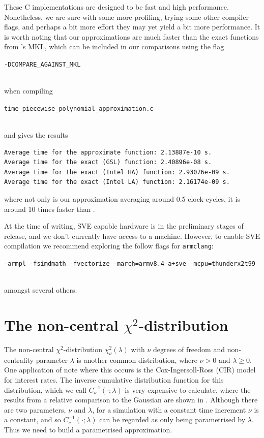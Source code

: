 \documentclass[11pt,a4paper,twoside,english]{extarticle}
\newcommand{\singlecodeline}[1]{\\[1em]\centerline{\lstinline[basicstyle=\ttfamily]$#1$}\\[1em]}
\begin{document}
These C implementations are designed to be fast and high performance. Nonetheless, we are sure with some more profiling, trying some other compiler flags, and perhaps a bit more effort they may yet yield a bit more performance. It is worth noting that our approximations are much faster than the exact functions from \intel's MKL, which can be included in our comparisons using the flag \singlecodeline{-DCOMPARE_AGAINST_MKL} when compiling \singlecodeline{time_piecewise_polynomial_approximation.c}
and gives the results
\begin{verbatim}
Average time for the approximate function: 2.13887e-10 s.
Average time for the exact (GSL) function: 2.40896e-08 s.
Average time for the exact (Intel HA) function: 2.93076e-09 s.
Average time for the exact (Intel LA) function: 2.16174e-09 s.
\end{verbatim}
where not only is our approximation averaging around 0.5 clock-cycles, it is around 10 times faster than \intel. 

At the time of writing, SVE capable hardware is in the preliminary stages of release, and we don't currently have access to a machine. However, to enable SVE compilation we recommend exploring the follow flags for \verb|armclang|: \singlecodeline{-armpl -fsimdmath -fvectorize -march=armv8.4-a+sve -mcpu=thunderx2t99}
amongst several others. 

\clearpage
\section{The non-central $ \chi^2 $-distribution}

The non-central $ \chi^2 $-distribution $ \chi^2_\nu(\lambda) $ with $ \nu $ degrees of freedom and non-centrality parameter $ \lambda $ is another common distribution, where $ \nu > 0 $ and $ \lambda \geq 0 $. One application of note where this occurs is the Cox-Ingersoll-Ross (CIR) model for interest rates. The inverse cumulative distribution function for this distribution, which we call $ C^{-1}_{\nu}(\cdot;\lambda) $ is very expensive to calculate, where the results from a relative comparison to the Gaussian are shown in . Although there are two parameters, $ \nu $ and $ \lambda $, for a simulation with a constant time increment $ \nu $ is a constant, and so $ C^{-1}_{\nu}(\cdot;\lambda) $ can be regarded as only being parametrised by $ \lambda $. Thus we need to build a parametrised approximation. 
\end{document}
